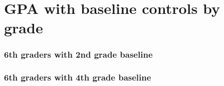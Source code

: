 \documentclass{beamer}
\begin{document}
\section{GPA with baseline controls by grade}

\begin{frame}
    \label{frame:twfe_gpa_controls_1}
    \frametitle{6th graders with 2nd grade baseline}
        {
    }

    \begin{flushleft}
        \hyperlink{frame:twfe_gpa_controls}{}
    \end{flushleft}       
\end{frame}

\begin{frame}
    \label{frame:twfe_gpa_controls_2}
    \frametitle{6th graders with 4th grade baseline}
        {
    }

    \begin{flushleft}
        \hyperlink{frame:twfe_gpa_controls}{}
    \end{flushleft}       
\end{frame}
\end{document}
